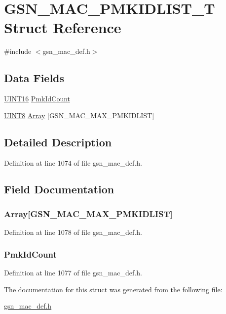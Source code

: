 \hypertarget{a00121}{
\section{GSN\_\-MAC\_\-PMKIDLIST\_\-T Struct Reference}
\label{a00121}
}


{\ttfamily \#include $<$gsn\_\-mac\_\-def.h$>$}

\subsection*{Data Fields}
\begin{DoxyCompactItemize}
\item 
\hyperlink{a00660_ga09f1a1fb2293e33483cc8d44aefb1eb1}{UINT16} \hyperlink{a00121_a0aa4552e75092f8a406809ad68ec8ea2}{PmkIdCount}
\item 
\hyperlink{a00660_gab27e9918b538ce9d8ca692479b375b6a}{UINT8} \hyperlink{a00121_ab10c0f54a3f0a76921d8ff0e7fbf315a}{Array} \mbox{[}GSN\_\-MAC\_\-MAX\_\-PMKIDLIST\mbox{]}
\end{DoxyCompactItemize}


\subsection{Detailed Description}


Definition at line 1074 of file gsn\_\-mac\_\-def.h.



\subsection{Field Documentation}
\hypertarget{a00121_ab10c0f54a3f0a76921d8ff0e7fbf315a}{
\subsubsection[{Array}]{ {\bf Array}\mbox{[}GSN\_\-MAC\_\-MAX\_\-PMKIDLIST\mbox{]}}}
\label{a00121_ab10c0f54a3f0a76921d8ff0e7fbf315a}


Definition at line 1078 of file gsn\_\-mac\_\-def.h.

\hypertarget{a00121_a0aa4552e75092f8a406809ad68ec8ea2}{
\subsubsection[{PmkIdCount}]{ {\bf PmkIdCount}}}
\label{a00121_a0aa4552e75092f8a406809ad68ec8ea2}


Definition at line 1077 of file gsn\_\-mac\_\-def.h.



The documentation for this struct was generated from the following file:\begin{DoxyCompactItemize}
\item 
\hyperlink{a00522}{gsn\_\-mac\_\-def.h}\end{DoxyCompactItemize}
